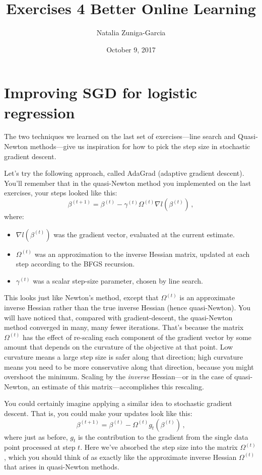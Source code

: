 \documentclass[11 pt]{article}
\author{Natalia Zuniga-Garcia}
\title{Exercises 4 Better Online Learning}
\date{October 9, 2017}
\begin{document}
\maketitle


\section{Improving SGD for logistic regression}

The two techniques we learned on the last set of exercises---line search and Quasi-Newton methods---give us inspiration for how to pick the step size in stochastic gradient descent.

Let's try the following approach, called AdaGrad (adaptive gradient descent).  You'll remember that in the quasi-Newton method you implemented on the last exercises, your steps looked like this:
$$
\beta^{(t+1)} = \beta^{(t)} - \gamma^{(t)} \Omega^{(t)} \nabla l(\beta^{(t)}) \, ,
$$
where:
\begin{itemize}
	\item $\nabla l(\beta^{(t)})$ was the gradient vector, evaluated at the current estimate.
	\item $\Omega^{(t)}$ was an approximation to the inverse Hessian matrix, updated at each step according to the BFGS recursion.
	\item $\gamma^{(t)}$ was a scalar step-size parameter, chosen by line search.
\end{itemize}
This looks just like Newton's method, except that $\Omega^{(t)}$ is an approximate inverse Hessian rather than the true inverse Hessian (hence quasi-Newton).  You will have noticed that, compared with gradient-descent, the quasi-Newton method converged in many, many fewer iterations.  That's because the matrix $\Omega^{(t)}$ has the effect of re-scaling each component of the gradient vector by some amount that depends on the curvature of the objective at that point.  Low curvature means a large step size is safer along that direction; high curvature means you need to be more conservative along that direction, because you might overshoot the minimum.  Scaling by the \emph{inverse} Hessian---or in the case of quasi-Newton, an estimate of this matrix---accomplishes this rescaling.

You could certainly imagine applying a similar idea to stochastic gradient descent.  That is, you could make your updates look like this:
\begin{equation}
\label{eqn:online_quasi_newton}
\beta^{(t+1)} = \beta^{(t)} - \Omega^{(t)} g_t(\beta^{(t)}) \, ,
\end{equation}
where just as before, $g_t$ is the contribution to the gradient from the single data point processed at step $t$.  Here we've absorbed the step size into the matrix $\Omega^{(t)}$, which you should think of as exactly like the approximate inverse Hessian $\Omega^{(t)}$ that arises in quasi-Newton methods.
\end{document}
